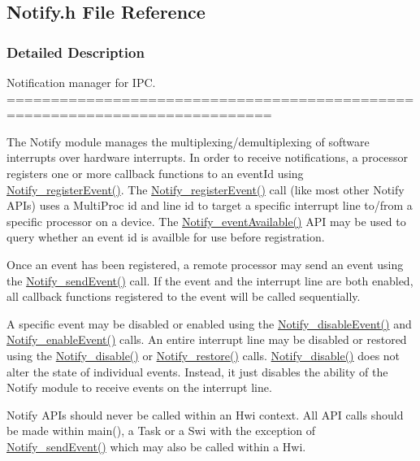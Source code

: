 \subsection{Notify.\-h File Reference}
\label{_notify_8h}


\subsubsection{Detailed Description}
Notification manager for I\-P\-C. ============================================================================

The Notify module manages the multiplexing/demultiplexing of software interrupts over hardware interrupts. In order to receive notifications, a processor registers one or more callback functions to an event\-Id using \hyperlink{_notify_8h_af0e6797faaeea3d07121ad83394dd1cb}{Notify\-\_\-register\-Event()}. The \hyperlink{_notify_8h_af0e6797faaeea3d07121ad83394dd1cb}{Notify\-\_\-register\-Event()} call (like most other Notify A\-P\-Is) uses a Multi\-Proc id and line id to target a specific interrupt line to/from a specific processor on a device. The \hyperlink{_notify_8h_a35609c7bf129016087dd520be69c14cf}{Notify\-\_\-event\-Available()} A\-P\-I may be used to query whether an event id is availble for use before registration.

Once an event has been registered, a remote processor may send an event using the \hyperlink{_notify_8h_ac0f8b4cb2245dd897b5b75485f6b5c13}{Notify\-\_\-send\-Event()} call. If the event and the interrupt line are both enabled, all callback functions registered to the event will be called sequentially.

A specific event may be disabled or enabled using the \hyperlink{_notify_8h_acb0512fe9bdbc30a1bd6d055d3c662d0}{Notify\-\_\-disable\-Event()} and \hyperlink{_notify_8h_a701ab77f8cd9b811dcca05e243815b85}{Notify\-\_\-enable\-Event()} calls. An entire interrupt line may be disabled or restored using the \hyperlink{_notify_8h_a0eeb5a2e898a287ec0e31be4e6a92364}{Notify\-\_\-disable()} or \hyperlink{_notify_8h_a07248810e2b457664a2a1f24a4179621}{Notify\-\_\-restore()} calls. \hyperlink{_notify_8h_a0eeb5a2e898a287ec0e31be4e6a92364}{Notify\-\_\-disable()} does not alter the state of individual events. Instead, it just disables the ability of the Notify module to receive events on the interrupt line.

Notify A\-P\-Is should never be called within an Hwi context. All A\-P\-I calls should be made within main(), a Task or a Swi with the exception of \hyperlink{_notify_8h_ac0f8b4cb2245dd897b5b75485f6b5c13}{Notify\-\_\-send\-Event()} which may also be called within a Hwi.

